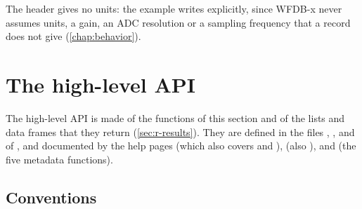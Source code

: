 The header  gives no units: the example writes  explicitly,
since WFDB-x never assumes units, a gain, an ADC resolution or a sampling frequency that
a record does not give (\cref{chap:behavior}).

\section{The high-level API}
\label{sec:r-api}

The high-level API is made of the functions of this section and of the lists and data
frames that they return (\cref{sec:r-results}). They are defined in the files
, ,  and  of
, and documented by the help pages  (which also covers
 and ),  (also
),  and  (the five
metadata functions).

\subsection{Conventions}
\label{sec:r-conventions}

